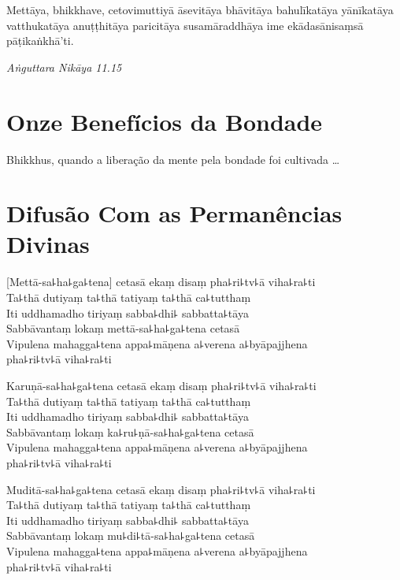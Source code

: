 Mettāya, bhikkhave, cetovimuttiyā āsevitāya bhāvitāya bahulīkatāya yānīkatāya vatthukatāya anuṭṭhitāya paricitāya susamāraddhāya ime ekādasānisaṃsā pāṭikaṅkhā'ti.

{\raggedleft
  \emph{Aṅguttara Nikāya 11.15}
\par}

\chapter[Onze Benefícios da Bondade]{Onze Benefícios da Bondade}

Bhikkhus, quando a liberação da mente pela bondade foi cultivada \ldots{}

\chapter*[Permanências Divinas]{Difusão Com as Permanências Divinas}

\delegateSetUseNext


\begin{leader}
\end{leader}

[Mettā-sa꜕ha꜕ga꜕tena] cetasā ekaṃ disaṃ pha꜕ri꜕tv꜕ā viha꜕ra꜕ti\\
Ta꜕thā dutiyaṃ ta꜕thā tatiyaṃ ta꜕thā ca꜕tutthaṃ\\
Iti uddhamadho tiriyaṃ sabba꜕dhi꜕ sabbatta꜕tāya\\
Sabbāvantaṃ lokaṃ mettā-sa꜕ha꜕ga꜕tena cetasā\\
Vipulena mahagga꜕tena appa꜕māṇena a꜕verena a꜕byāpajjhena\\
\vin pha꜕ri꜕tv꜕ā viha꜕ra꜕ti

Karuṇā-sa꜕ha꜕ga꜕tena cetasā ekaṃ disaṃ pha꜕ri꜕tv꜕ā viha꜕ra꜕ti\\
Ta꜕thā dutiyaṃ ta꜕thā tatiyaṃ ta꜕thā ca꜕tutthaṃ\\
Iti uddhamadho tiriyaṃ sabba꜕dhi꜕ sabbatta꜕tāya\\
Sabbāvantaṃ lokaṃ ka꜕ru꜕ṇā-sa꜕ha꜕ga꜕tena cetasā\\
Vipulena mahagga꜕tena appa꜕māṇena a꜕verena a꜕byāpajjhena\\
\vin pha꜕ri꜕tv꜕ā viha꜕ra꜕ti

Muditā-sa꜕ha꜕ga꜕tena cetasā ekaṃ disaṃ pha꜕ri꜕tv꜕ā viha꜕ra꜕ti\\
Ta꜕thā dutiyaṃ ta꜕thā tatiyaṃ ta꜕thā ca꜕tutthaṃ\\
Iti uddhamadho tiriyaṃ sabba꜕dhi꜕ sabbatta꜕tāya\\
Sabbāvantaṃ lokaṃ mu꜕di꜕tā-sa꜕ha꜕ga꜕tena cetasā\\
Vipulena mahagga꜕tena appa꜕māṇena a꜕verena a꜕byāpajjhena\\
\vin pha꜕ri꜕tv꜕ā viha꜕ra꜕ti

